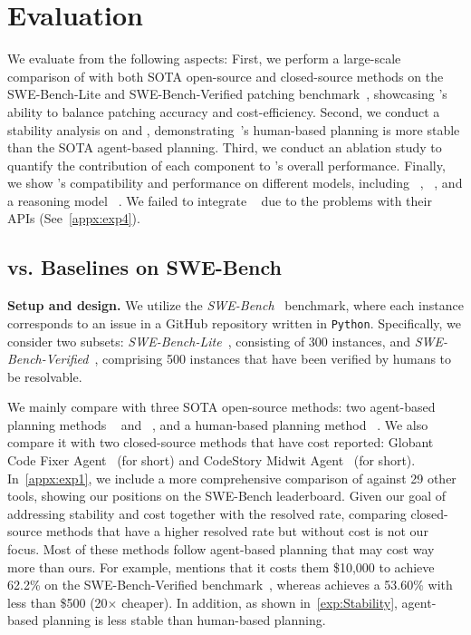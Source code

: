 \section{Evaluation}
\label{sec:Evaluation}

We evaluate \sys from the following aspects:
First, we perform a large-scale comparison of \sys with both SOTA open-source and closed-source methods on the SWE-Bench-Lite and SWE-Bench-Verified patching benchmark~\cite{jimenez2023swe}, showcasing \sys's ability to balance patching accuracy and cost-efficiency.
Second, we conduct a stability analysis on \sys and \openhands, demonstrating~\sys{}'s human-based planning is more stable than the SOTA agent-based planning. 
Third, we conduct an ablation study to quantify the contribution of each component to \sys's overall performance.
Finally, we show \sys's compatibility and performance on different models, including \gpt~\cite{GPT-4o}, \claude~\cite{anthropic_claude}, and a reasoning model \oo~\cite{GPT-o3}. 
We failed to integrate \deepseek~\cite{DeepSeek-r1} due to the problems with their APIs (See~\cref{appx:exp4}).

\subsection{\sys vs. Baselines on SWE-Bench}
\label{exp:comparison}

\noindent\textbf{Setup and design.}
We utilize the \textit{SWE-Bench}~\cite{jimenez2023swe} benchmark, where each instance corresponds to an issue in a GitHub repository written in \texttt{Python}.
Specifically, we consider two subsets: \textit{SWE-Bench-Lite}~\cite{SWE-Bench-Lite}, consisting of 300 instances, and \textit{SWE-Bench-Verified}~\cite{SWE-Bench-Verified}, comprising 500 instances that have been verified by humans to be resolvable.

We mainly compare \sys with three SOTA open-source methods: two agent-based planning methods \openhands~\cite{wang2024openhands} and \autocode~\cite{zhang2024autocoderover}, and a human-based planning method \agentless~\cite{xia2024agentless}. 
We also compare it with two closed-source methods that have cost reported: Globant Code Fixer Agent~\cite{Globant_Code_Fixer_Agent} (\globant for short) and CodeStory Midwit Agent~\cite{CodeStory_Midwit_Agent} (\codestory for short).
In~\cref{appx:exp1}, we include a more comprehensive comparison of \sys against 29 other tools, showing our positions on the SWE-Bench leaderboard.
Given our goal of addressing stability and cost together with the resolved rate, comparing closed-source methods that have a higher resolved rate but without cost is not our focus.
Most of these methods follow agent-based planning that may cost way more than ours.
For example, \codestory mentions that it costs them \$10,000 to achieve 62.2\% on the SWE-Bench-Verified benchmark~\cite{SWE-Bench-Verified}, whereas \sys achieves a 53.60\% with less than \$500 (20$\times$ cheaper).
In addition, as shown in~\cref{exp:Stability}, agent-based planning is less stable than human-based planning.

